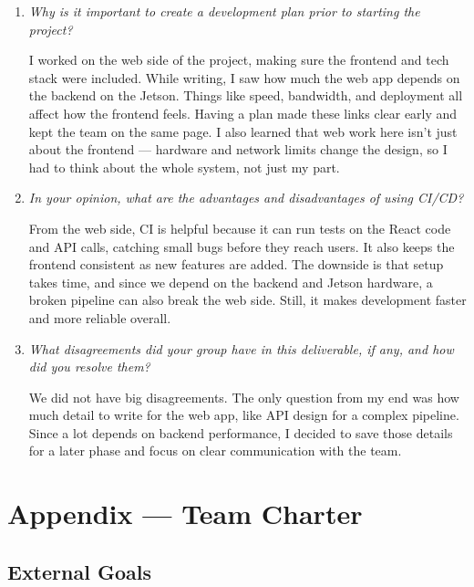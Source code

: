 \documentclass{article}
\begin{document}
\begin{enumerate}
  \item \textit{Why is it important to create a development plan prior to starting the project?}

        I worked on the web side of the project, making sure the frontend and tech
        stack were included. While writing, I saw how much the web app depends on the
        backend on the Jetson. Things like speed, bandwidth, and deployment all affect
        how the frontend feels. Having a plan made these links clear early and kept the
        team on the same page. I also learned that web work here isn’t just about the
        frontend --- hardware and network limits change the design, so I had to think
        about the whole system, not just my part.

  \item \textit{In your opinion, what are the advantages and disadvantages of using CI/CD?}

        From the web side, CI is helpful because it can run tests on the React code and
        API calls, catching small bugs before they reach users. It also keeps the
        frontend consistent as new features are added. The downside is that setup takes
        time, and since we depend on the backend and Jetson hardware, a broken pipeline
        can also break the web side. Still, it makes development faster and more
        reliable overall.

  \item \textit{What disagreements did your group have in this deliverable, if any, and how did you resolve them?}

        We did not have big disagreements. The only question from my end was how much
        detail to write for the web app, like API design for a complex pipeline. Since
        a lot depends on backend performance, I decided to save those details for a
        later phase and focus on clear communication with the team.
\end{enumerate}

\newpage{}
\section*{Appendix --- Team Charter}


\subsection*{External Goals}
\end{document}

